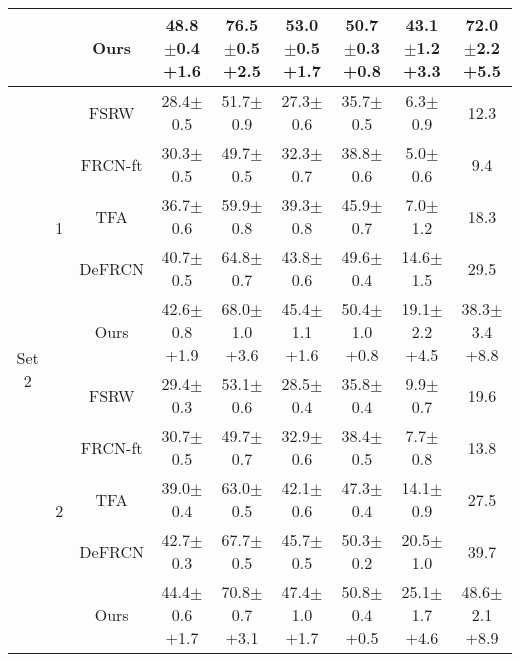 \documentclass{article}
\begin{document}
\begin{table}[hbt!]
\begin{adjustbox}{width=0.79\textwidth}
{\begin{tabular}{c|c|c|ccc|c|cc}
         && \cellcolor{gray!30}Ours&\cellcolor{gray!30}48.8$\pm$0.4 {\scriptsize \color{red}+1.6}&\cellcolor{gray!30}76.5$\pm$0.5 {\scriptsize \color{red}+2.5}&\cellcolor{gray!30}53.0$\pm$0.5 {\scriptsize \color{red}+1.7}&\cellcolor{gray!30}50.7$\pm$0.3 {\scriptsize \color{red}+0.8}&\cellcolor{gray!30}43.1$\pm$1.2 {\scriptsize \color{red}+3.3}&\cellcolor{gray!30}72.0$\pm$2.2 {\scriptsize \color{red}+5.5}\\
         \midrule
         \multirow{25}{*}{ Set 2}&\multirow{5}{*}{1}&FSRW \cite{metayolo} &28.4$\pm$0.5&51.7$\pm$0.9&27.3$\pm$0.6&35.7$\pm$0.5&6.3$\pm$0.9&12.3\\
         &&FRCN-ft \cite{metarcnn} &30.3$\pm$0.5&49.7$\pm$0.5&32.3$\pm$0.7&38.8$\pm$0.6&5.0$\pm$0.6&9.4\\
         &&TFA \cite{tfa}&36.7$\pm$0.6&59.9$\pm$0.8&39.3$\pm$0.8&45.9$\pm$0.7&7.0$\pm$1.2&18.3\\
         &&DeFRCN \cite{defrcn}&40.7$\pm$0.5&64.8$\pm$0.7&43.8$\pm$0.6&49.6$\pm$0.4&14.6$\pm$1.5&29.5\\
         && \cellcolor{gray!30}Ours&\cellcolor{gray!30}42.6$\pm$0.8 {\scriptsize \color{red}+1.9}&\cellcolor{gray!30}68.0$\pm$1.0 {\scriptsize \color{red}+3.6}&\cellcolor{gray!30}45.4$\pm$1.1 {\scriptsize \color{red}+1.6}&\cellcolor{gray!30}50.4$\pm$1.0 {\scriptsize \color{red}+0.8}&\cellcolor{gray!30}19.1$\pm$2.2 {\scriptsize \color{red}+4.5}&\cellcolor{gray!30}38.3$\pm$3.4 {\scriptsize \color{red}+8.8}\\
         \cmidrule{2-9}
         &\multirow{5}{*}{2}&FSRW \cite{metayolo} & 29.4$\pm$0.3&53.1$\pm$0.6&28.5$\pm$0.4&35.8$\pm$0.4&9.9$\pm$0.7&19.6  \\
         &&FRCN-ft \cite{metarcnn}&30.7$\pm$0.5&49.7$\pm$0.7&32.9$\pm$0.6&38.4$\pm$0.5&7.7$\pm$0.8&13.8\\
         &&TFA \cite{tfa}&39.0$\pm$0.4&63.0$\pm$0.5&42.1$\pm$0.6&47.3$\pm$0.4&14.1$\pm$0.9&27.5\\
         &&DeFRCN \cite{defrcn}&42.7$\pm$0.3&67.7$\pm$0.5&45.7$\pm$0.5&50.3$\pm$0.2&20.5$\pm$1.0&39.7\\
         && \cellcolor{gray!30}Ours&\cellcolor{gray!30}44.4$\pm$0.6 {\scriptsize \color{red}+1.7}&\cellcolor{gray!30}70.8$\pm$0.7 {\scriptsize \color{red}+3.1}&\cellcolor{gray!30}47.4$\pm$1.0 {\scriptsize \color{red}+1.7}&\cellcolor{gray!30}50.8$\pm$0.4 {\scriptsize \color{red}+0.5}&\cellcolor{gray!30}25.1$\pm$1.7 {\scriptsize \color{red}+4.6}&\cellcolor{gray!30}48.6$\pm$2.1 {\scriptsize \color{red}+8.9}\\
         \cmidrule{2-9}

\end{tabular}}
\end{adjustbox}
\end{table}
\end{document}
